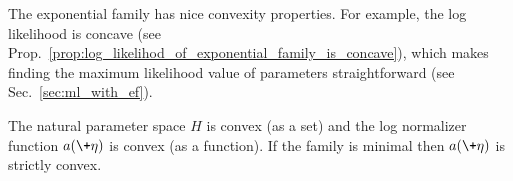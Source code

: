 \documentclass{article} %
\newcommand{\logNormalizerFunction}{a}
\newcommand{\naturalParam}{\+\eta}
\newcommand{\naturalParamSpace}{H}
\begin{document}
The exponential family has nice convexity properties.  For example, the log likelihood is concave (see Prop.~\ref{prop:log_likelihod_of_exponential_family_is_concave}), which makes finding the maximum likelihood value of parameters straightforward (see Sec.~\ref{sec:ml_with_ef}).

\begin{proposition}
The natural parameter space $\naturalParamSpace$ is convex (as a set) and the log normalizer function $\logNormalizerFunction(\naturalParam)$ is convex (as a function). If the family is minimal then $\logNormalizerFunction(\naturalParam)$ is strictly convex.
\label{prop:basic_convexity_properties_of_the_exponential_family}
\end{proposition}
\end{document}
